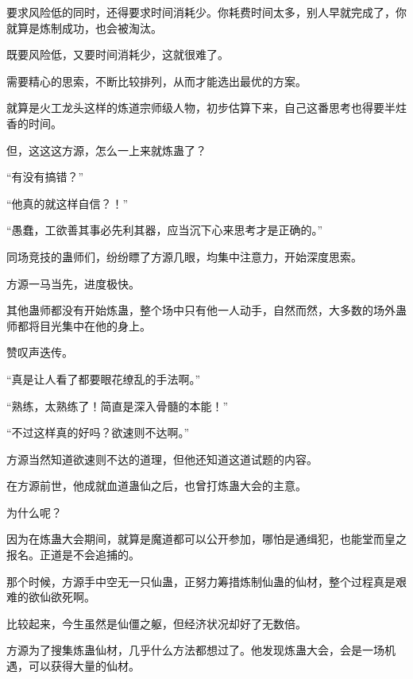 \begin{this_body}
要求风险低的同时，还得要求时间消耗少。你耗费时间太多，别人早就完成了，你就算是炼制成功，也会被淘汰。

既要风险低，又要时间消耗少，这就很难了。

需要精心的思索，不断比较排列，从而才能选出最优的方案。

就算是火工龙头这样的炼道宗师级人物，初步估算下来，自己这番思考也得要半炷香的时间。

但，这这这方源，怎么一上来就炼蛊了？

“有没有搞错？”

“他真的就这样自信？！”

“愚蠢，工欲善其事必先利其器，应当沉下心来思考才是正确的。”

同场竞技的蛊师们，纷纷瞟了方源几眼，均集中注意力，开始深度思索。

方源一马当先，进度极快。

其他蛊师都没有开始炼蛊，整个场中只有他一人动手，自然而然，大多数的场外蛊师都将目光集中在他的身上。

赞叹声迭传。

“真是让人看了都要眼花缭乱的手法啊。”

“熟练，太熟练了！简直是深入骨髓的本能！”

“不过这样真的好吗？欲速则不达啊。”

方源当然知道欲速则不达的道理，但他还知道这道试题的内容。

在方源前世，他成就血道蛊仙之后，也曾打炼蛊大会的主意。

为什么呢？

因为在炼蛊大会期间，就算是魔道都可以公开参加，哪怕是通缉犯，也能堂而皇之报名。正道是不会追捕的。

那个时候，方源手中空无一只仙蛊，正努力筹措炼制仙蛊的仙材，整个过程真是艰难的欲仙欲死啊。

比较起来，今生虽然是仙僵之躯，但经济状况却好了无数倍。

方源为了搜集炼蛊仙材，几乎什么方法都想过了。他发现炼蛊大会，会是一场机遇，可以获得大量的仙材。

\end{this_body}

